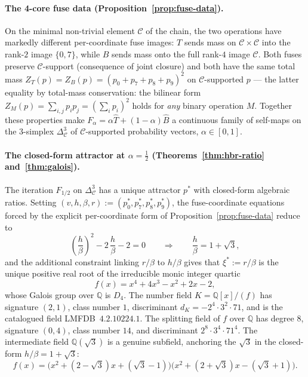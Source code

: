 \documentclass[11pt,reqno]{amsart}
\theoremstyle{plain}
\theoremstyle{definition}
\theoremstyle{remark}
\newcommand{\Q}{\mathbb{Q}}
\newcommand{\Cfour}{\mathcal{C}}
\newcommand{\Tfuse}{\widehat{T}}
\newcommand{\Bfuse}{\widehat{B}}
\begin{document}
\paragraph{The 4-core fuse data (Proposition~\ref{prop:fuse-data}).}
On the minimal non-trivial element $\Cfour$ of the chain, the two
operations have markedly different per-coordinate fuse images:
$T$ sends mass on $\Cfour\times\Cfour$ into the rank-$2$ image
$\{0, 7\}$, while $B$ sends mass onto the full rank-$4$ image
$\Cfour$. Both fuses preserve $\Cfour$-support (consequence of
joint closure) and both have the same total mass $Z_{T}(p) =
Z_{B}(p) = (p_{0}+p_{7}+p_{8}+p_{9})^{2}$ on $\Cfour$-supported
$p$ --- the latter equality by total-mass conservation: the
bilinear form $Z_{M}(p) = \sum_{i,j}p_{i}p_{j} =
(\sum_{i}p_{i})^{2}$ holds for \emph{any} binary operation $M$.
Together these properties make
$F_\alpha = \alpha\Tfuse + (1-\alpha)\Bfuse$ a continuous family
of self-maps on the $3$-simplex $\Delta^{3}_{\Cfour}$ of
$\Cfour$-supported probability vectors, $\alpha\in[0,1]$.

\paragraph{The closed-form attractor at $\alpha = \tfrac{1}{2}$
(Theorems~\ref{thm:hbr-ratio} and~\ref{thm:galois}).}
The iteration $F_{1/2}$ on $\Delta^{3}_{\Cfour}$ has a unique
attractor $p^*$ with closed-form algebraic ratios. Setting
$(v, h, \beta, r) := (p^*_{0}, p^*_{7}, p^*_{8}, p^*_{9})$, the
fuse-coordinate equations forced by the explicit per-coordinate
form of Proposition~\ref{prop:fuse-data} reduce to
\[
  \left(\frac{h}{\beta}\right)^{2} - 2\,\frac{h}{\beta} - 2 = 0
  \qquad\Longrightarrow\qquad \frac{h}{\beta} = 1 + \sqrt{3},
\]
and the additional constraint linking $r/\beta$ to $h/\beta$
gives that $\xi^* := r/\beta$ is the unique positive real root of
the irreducible monic integer quartic
\[
  f(x) = x^{4} + 4x^{3} - x^{2} + 2x - 2,
\]
whose Galois group over $\Q$ is $D_{4}$. The number field
$K = \Q[x]/(f)$ has signature $(2, 1)$, class number $1$,
discriminant $d_{K} = -2^{4}\cdot 3^{2}\cdot 71$, and is the
catalogued field LMFDB~$4.2.10224.1$. The splitting field of $f$
over $\Q$ has degree $8$, signature $(0, 4)$, class number $14$,
and discriminant $2^{8}\cdot 3^{4}\cdot 71^{4}$. The intermediate
field $\Q(\sqrt{3})$ is a genuine subfield, anchoring the
$\sqrt{3}$ in the closed-form $h/\beta = 1+\sqrt{3}$:
\[
  f(x) = \bigl(x^{2}+(2-\sqrt{3})x+(\sqrt{3}-1)\bigr)
         \bigl(x^{2}+(2+\sqrt{3})x-(\sqrt{3}+1)\bigr).
\]
\end{document}
